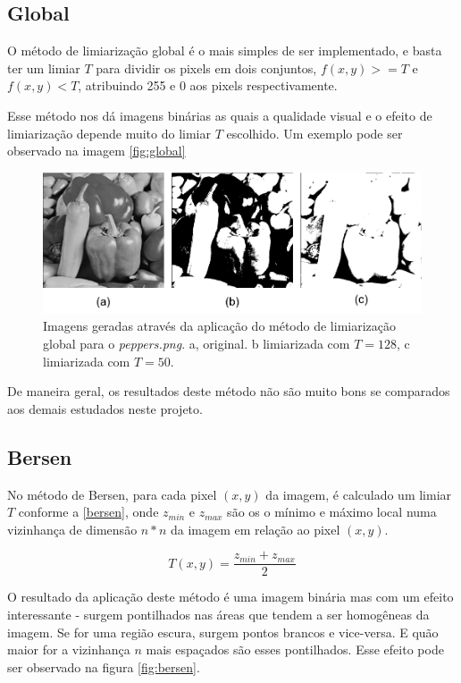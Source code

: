 \subsection{Global}

    O método de limiarização global é o mais simples de ser implementado, e basta ter um limiar $T$ para dividir os pixels em dois conjuntos, $f(x,y) >= T$ e $f(x, y) < T$, atribuindo 255 e 0 aos pixels respectivamente.

    Esse método nos dá imagens binárias as quais a qualidade visual e o efeito de limiarização depende muito do limiar $T$ escolhido. Um exemplo pode ser observado na imagem \ref{fig:global}

    \begin{figure}[ht]
        \centering
        \includegraphics[width=\linewidth]{global.png}
        \caption{Imagens geradas através da aplicação do método de limiarização global para o \textit{peppers.png}. a, original. b limiarizada com $T=128$, c limiarizada com $T=50$.}
        \label{fig:gobal}
    \end{figure}

    De maneira geral, os resultados deste método não são muito bons se comparados aos demais estudados neste projeto.

\subsection{Bersen}

    No método de Bersen, para cada pixel $(x,y)$ da imagem, é calculado um limiar $T$ conforme a \ref{bersen}, onde $z_{min}$ e $z_{max}$ são os o mínimo e máximo local numa vizinhança de dimensão $n*n$ da imagem em relação ao pixel $(x,y)$.

    \begin{equation}
      T(x,y) = \dfrac{z_{min} + z_{max}}{2}
    \label{bersen}
    \end{equation}

    O resultado da aplicação deste método é uma imagem binária mas com um efeito interessante - surgem pontilhados nas áreas que tendem a ser homogêneas da imagem. Se for uma região escura, surgem pontos brancos e vice-versa.
    E quão maior for a vizinhança $n$ mais espaçados são esses pontilhados.
    Esse efeito pode ser observado na figura \ref{fig:bersen}.


